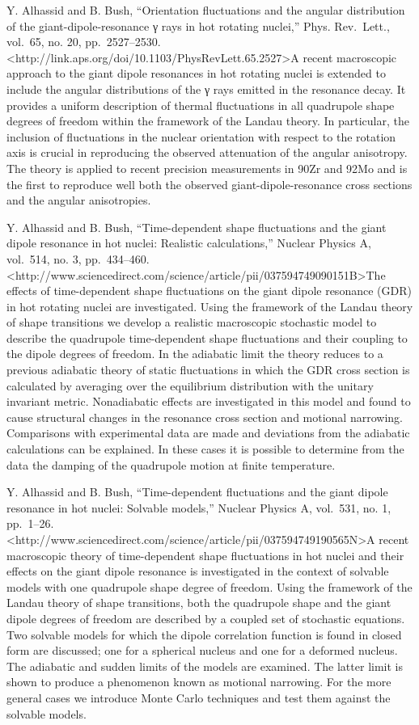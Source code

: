 \documentclass[]{article}
\begin{document}
Y. Alhassid and B. Bush, ``Orientation fluctuations and the angular
distribution of the giant-dipole-resonance γ rays in hot rotating
nuclei,'' Phys. Rev.~Lett., vol.~65, no. 20, pp.~2527--2530.
\textless{}http://link.aps.org/doi/10.1103/PhysRevLett.65.2527\textgreater{}A
recent macroscopic approach to the giant dipole resonances in hot
rotating nuclei is extended to include the angular distributions of the
γ rays emitted in the resonance decay. It provides a uniform description
of thermal fluctuations in all quadrupole shape degrees of freedom
within the framework of the Landau theory. In particular, the inclusion
of fluctuations in the nuclear orientation with respect to the rotation
axis is crucial in reproducing the observed attenuation of the angular
anisotropy. The theory is applied to recent precision measurements in
90Zr and 92Mo and is the first to reproduce well both the observed
giant-dipole-resonance cross sections and the angular anisotropies.

Y. Alhassid and B. Bush, ``Time-dependent shape fluctuations and the
giant dipole resonance in hot nuclei: Realistic calculations,'' Nuclear
Physics A, vol.~514, no. 3, pp.~434--460.
\textless{}http://www.sciencedirect.com/science/article/pii/037594749090151B\textgreater{}The
effects of time-dependent shape fluctuations on the giant dipole
resonance (GDR) in hot rotating nuclei are investigated. Using the
framework of the Landau theory of shape transitions we develop a
realistic macroscopic stochastic model to describe the quadrupole
time-dependent shape fluctuations and their coupling to the dipole
degrees of freedom. In the adiabatic limit the theory reduces to a
previous adiabatic theory of static fluctuations in which the GDR cross
section is calculated by averaging over the equilibrium distribution
with the unitary invariant metric. Nonadiabatic effects are investigated
in this model and found to cause structural changes in the resonance
cross section and motional narrowing. Comparisons with experimental data
are made and deviations from the adiabatic calculations can be
explained. In these cases it is possible to determine from the data the
damping of the quadrupole motion at finite temperature.

Y. Alhassid and B. Bush, ``Time-dependent fluctuations and the giant
dipole resonance in hot nuclei: Solvable models,'' Nuclear Physics A,
vol.~531, no. 1, pp.~1--26.
\textless{}http://www.sciencedirect.com/science/article/pii/037594749190565N\textgreater{}A
recent macroscopic theory of time-dependent shape fluctuations in hot
nuclei and their effects on the giant dipole resonance is investigated
in the context of solvable models with one quadrupole shape degree of
freedom. Using the framework of the Landau theory of shape transitions,
both the quadrupole shape and the giant dipole degrees of freedom are
described by a coupled set of stochastic equations. Two solvable models
for which the dipole correlation function is found in closed form are
discussed; one for a spherical nucleus and one for a deformed nucleus.
The adiabatic and sudden limits of the models are examined. The latter
limit is shown to produce a phenomenon known as motional narrowing. For
the more general cases we introduce Monte Carlo techniques and test them
against the solvable models.
\end{document}
